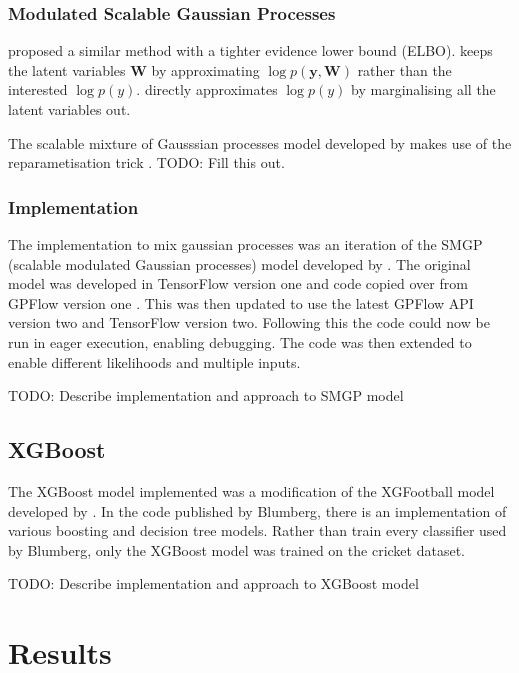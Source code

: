\documentclass[12pt,a4paper]{report}
\theoremstyle{definition}
\begin{document}
\subsection{Modulated Scalable Gaussian Processes}

\citet{Lui2020} proposed a similar method with a tighter evidence lower bound (ELBO).
\citet{Kaiser2018} keeps the latent variables $\textbf{W}$ by approximating $\log p(\textbf{y}, \textbf{W})$ rather than the interested $\log p(y)$.
\citet{Lui2020} directly approximates $\log p(y)$ by marginalising all the latent variables out.

The scalable mixture of Gausssian processes model developed by \citet{Lui2020} makes use of the reparametisation trick \citep{Maddison2017}.
TODO: Fill this out.

\subsection{Implementation}

The implementation to mix gaussian processes was an iteration of the SMGP (scalable modulated Gaussian processes) model developed by \citet{Lui2020}.
The original model was developed in TensorFlow version one and code copied over from GPFlow version one \citep{GPflow2017}.
This was then updated to use the latest GPFlow API version two and TensorFlow version two. 
Following this the code could now be run in eager execution, enabling debugging.
The code was then extended to enable different likelihoods and multiple inputs.

TODO: Describe implementation and approach to SMGP model

\section{XGBoost}

The XGBoost \citep{Chen2016} model implemented was a modification of the XGFootball model developed by \citet{Blumberg2020}.
In the code published by Blumberg, there is an implementation of various boosting and decision tree models.
Rather than train every classifier used by Blumberg, only the XGBoost model was trained on the cricket dataset.

TODO: Describe implementation and approach to XGBoost model

\chapter{Results}
\end{document}
